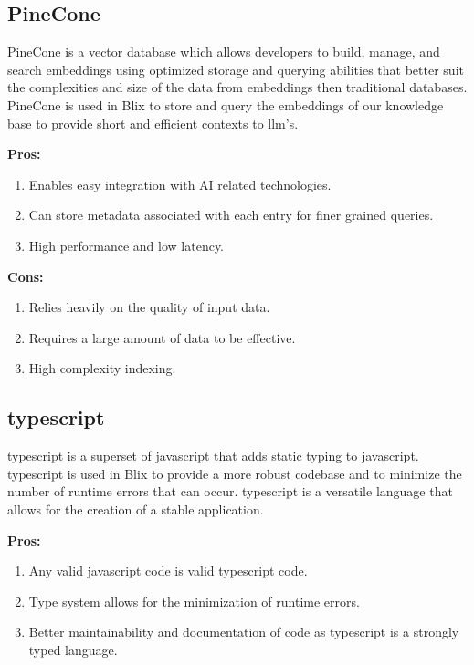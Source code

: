 \documentclass[11pt,a4paper]{article}
\begin{document}
\subsection{PineCone}

PineCone is a vector database which allows developers to build, manage, and search
embeddings using optimized storage and querying abilities that better suit the complexities
and size of the data from embeddings then traditional databases. PineCone is used in Blix
to store and query the embeddings of our knowledge base to provide short and efficient contexts
to llm's.

\textbf{Pros:}
\begin{enumerate}[label*=\arabic*.]
	\item[\textbullet] Enables easy integration with AI related technologies.
	\item[\textbullet] Can store metadata associated with each entry for finer grained queries.
	\item[\textbullet] High performance and low latency.
\end{enumerate}

\textbf{Cons:}
\begin{enumerate}[label*=\arabic*.]
	\item[\textbullet] Relies heavily on the quality of input data.
	\item[\textbullet] Requires a large amount of data to be effective.
	\item[\textbullet] High complexity indexing.
\end{enumerate}

\subsection{typescript}

typescript is a superset of javascript that adds static typing to javascript. typescript
is used in Blix to provide a more robust codebase and to minimize the number of runtime errors
that can occur. typescript is a versatile language that allows for the creation of a 
stable application.

\textbf{Pros:}
\begin{enumerate}[label*=\arabic*.]
	\item[\textbullet] Any valid javascript code is valid typescript code.
	\item[\textbullet] Type system allows for the minimization of runtime errors.
	\item[\textbullet] Better maintainability and documentation of code as typescript is a strongly typed language.
\end{enumerate}
\end{document}
